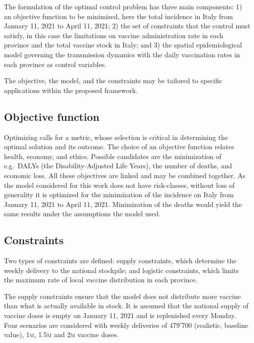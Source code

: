 The formulation of the optimal control problem has three main components: 1) an objective function to be minimized, here the total incidence in Italy from January 11, 2021 to April 11, 2021; 2) the set of constraints that the control must satisfy, in this case the limitations on vaccine administration rate in each province and the total vaccine stock in Italy; and 3) the spatial epidemiological model\cite{Gatto:SpreadDynamicsCOVID19:2020, Bertuzzo:GeographyCOVID19Spread:2020} governing the transmission dynamics with the daily vaccination rates in each province as control variables.

The objective, the model, and the constraints may be tailored to specific applications within the proposed framework.

\subsection{Objective function}
 Optimizing calls for a metric, whose selection is critical in determining the optimal solution and its outcome. The choice of an objective function relates health, economy, and ethics. Possible candidates are the minimization of e.g.~DALYs (the Disability-Adjusted Life Years), the number of deaths, and economic loss\cite{Du:ComparativeCosteffectivenessSARSCoV2:2021}. All these objectives are linked and may be combined together. As the model considered for this work does not have risk-classes, without loss of generality it is optimized for the minimization of the incidence on Italy from January 11, 2021 to April 11, 2021. Minimization of the deaths would yield the same results under the assumptions the model used.

\subsection{Constraints} Two types of constraints are defined: supply constraints, which determine the weekly delivery to the national stockpile; and logistic constraints, which limits the maximum rate of local vaccine distribution in each province.

The supply constraints ensure that the model does not distribute more vaccine than what is actually available in stock. It is assumed that the national supply of vaccine doses is empty on January 11, 2021 and is replenished every Monday. Four scenarios are considered with weekly deliveries of 479'700 (realistic, baseline value), 1\textsc{m}, 1.5\textsc{m} and 2\textsc{m} vaccine doses.

